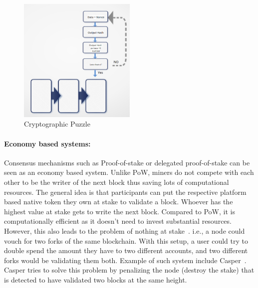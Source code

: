 \begin{figure}
	\begin{center}
	\includegraphics[width=0.5\textwidth]{Images/CryptographicPuzzle.eps}
	\caption{Cryptographic Puzzle}
	\label{fig:cryptographicPuzzle}
	\end{center}
\end{figure}
\paragraph{Economy based systems:}Consensus mechanisms such as Proof-of-stake
or delegated proof-of-stake can be seen as an economy based system. Unlike PoW,
miners do not compete with each other to be the writer of the next block thus
saving lots of computational resources. The general idea is that participants
can put the respective platform based native token they own at stake to
validate a block. Whoever has the highest value at stake gets to write the next
block. Compared to PoW, it is computationally efficient as it doesn't need to
invest substantial resources. However, this also leads to the problem of
nothing at stake~\cite{houy2014will}. i.e., a node could vouch for two forks of
the same blockchain. With this setup, a user could try to double spend the
amount they have to two different accounts, and two different forks would be
validating them both. Example of such system include
Casper~\cite{buterin2017casper}. Casper tries to solve this problem by
penalizing the node (destroy the stake) that is detected to have validated two
blocks at the same height.
